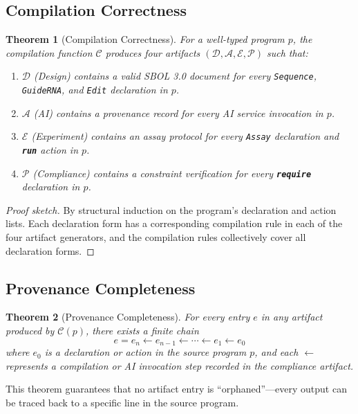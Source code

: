 \documentclass[12pt,a4paper]{article}
\newtheorem{theorem}{Theorem}[section]
\newcommand{\ty}[1]{\texttt{#1}}
\newcommand{\kw}[1]{\textbf{\texttt{#1}}}
\begin{document}
\subsection{Compilation Correctness}

\begin{theorem}[Compilation Correctness]
\label{thm:compilation}
For a well-typed program $p$, the compilation function $\mathcal{C}$ produces four artifacts $(\mathcal{D}, \mathcal{A}, \mathcal{E}, \mathcal{P})$ such that:
\begin{enumerate}[label=(\alph*)]
    \item $\mathcal{D}$ (Design) contains a valid SBOL 3.0 document for every \ty{Sequence}, \ty{GuideRNA}, and \ty{Edit} declaration in $p$.
    \item $\mathcal{A}$ (AI) contains a provenance record for every AI service invocation in $p$.
    \item $\mathcal{E}$ (Experiment) contains an assay protocol for every \ty{Assay} declaration and \kw{run} action in $p$.
    \item $\mathcal{P}$ (Compliance) contains a constraint verification for every \kw{require} declaration in $p$.
\end{enumerate}
\end{theorem}

\begin{proof}[Proof sketch]
By structural induction on the program's declaration and action lists. Each declaration form has a corresponding compilation rule in each of the four artifact generators, and the compilation rules collectively cover all declaration forms.
\end{proof}

\subsection{Provenance Completeness}

\begin{theorem}[Provenance Completeness]
\label{thm:provenance}
For every entry $e$ in any artifact produced by $\mathcal{C}(p)$, there exists a finite chain
\[
e = e_n \leftarrow e_{n-1} \leftarrow \cdots \leftarrow e_1 \leftarrow e_0
\]
where $e_0$ is a declaration or action in the source program $p$, and each $\leftarrow$ represents a compilation or AI invocation step recorded in the compliance artifact.
\end{theorem}

This theorem guarantees that no artifact entry is ``orphaned''---every output can be traced back to a specific line in the source program.
\end{document}
